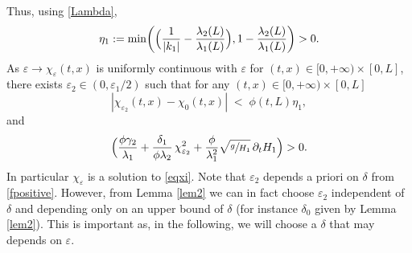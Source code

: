 Thus, using \eqref{Lambda},
\begin{equation}
\label{defeta1}
\eta_{1}:=\min \biggl(\Bigl(\frac{1}{|k_{1}|}-\frac{\lambda_{2}(L)}{\lambda_{1}(L)} \Bigr),1-\frac{\lambda_{2}(L)}{\lambda_{1}(L)} \biggr)>0.
\end{equation}
As $\varepsilon\to \chi_{\varepsilon}(t,x)$ is uniformly continuous with $\varepsilon$ for $(t,x)\in[0,{+}\infty)\times[0,L]$,
there exists
$\varepsilon_{2}\in(0,\varepsilon_{1}/2)$ such that
for any $(t,x)\in[0,{+}\infty)\times[0,L]$
\begin{equation}
|\chi_{\varepsilon_{2}}(t,x)-\chi_{0}(t,x)| \;{<}\; \phi(t,L)\eta_{1},
\label{fL}
\end{equation}
and
\begin{equation}
\Bigl(\frac{\phi\gamma_{2}}{\lambda_{1}}+\frac{\delta_{1}}{\phi\lambda_{2}}\,\chi_{\varepsilon_{2}}^{2}+{\frac{\phi}{\lambda_{1}^{2}}}\sqrt{\sfrac{g}{H_{1}}}\,\partial_{t} H_{1} \Bigr)>0.
\label{fpositive}
\end{equation}
{In particular $\chi_{\varepsilon}$ is a solution to \eqref{eqxi}.}
Note that $\varepsilon_{2}$ depends a priori on $\delta$ from \eqref{fpositive}. However, from Lemma \ref{lem2}
we can in fact choose $\varepsilon_{2}$ independent of $\delta$ and depending only on an upper bound of $\delta$ (for instance $\delta_{0}$ given by Lemma \ref{lem2}). This is important as, in the following,
we will choose
a $\delta$ that may depends on $\varepsilon$.

